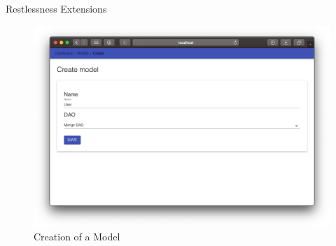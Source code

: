 \begin{chapter}{Restlessness Extensions}
    \begin{figure}
        \centering
        \includegraphics[width=\linewidth]{source/images/rln-wi-create-model.png}
        \caption{Creation of a Model}
        \label{fig:wi_dao_mongo_model}
    \end{figure}

\end{chapter}